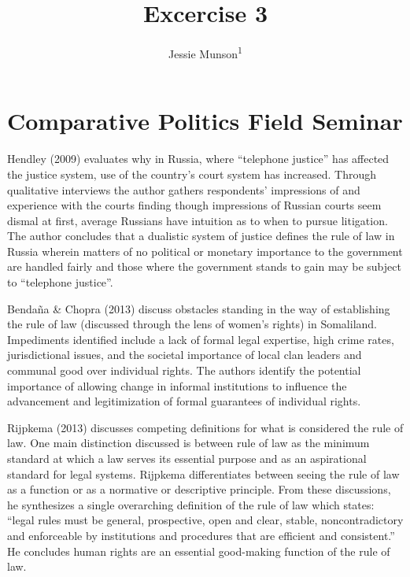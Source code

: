 \documentclass[
  english,
  man]{apa6}
\title{Excercise 3}
\author{Jessie Munson\textsuperscript{1}}
\date{}
\affiliation{\vspace{0.5cm}\textsuperscript{1} University of Wisconsin - Madison\\\textsuperscript{2} Department of Political Science}
\begin{document}
\maketitle

\hypertarget{comparative-politics-field-seminar}{%
\section{Comparative Politics Field Seminar}\label{comparative-politics-field-seminar}}

Hendley (2009) evaluates why in Russia, where \enquote{telephone justice} has affected the justice system, use of the country's court system has increased. Through qualitative interviews the author gathers respondents' impressions of and experience with the courts finding though impressions of Russian courts seem dismal at first, average Russians have intuition as to when to pursue litigation. The author concludes that a dualistic system of justice defines the rule of law in Russia wherein matters of no political or monetary importance to the government are handled fairly and those where the government stands to gain may be subject to \enquote{telephone justice}.

Bendaña \& Chopra (2013) discuss obstacles standing in the way of establishing the rule of law (discussed through the lens of women's rights) in Somaliland. Impediments identified include a lack of formal legal expertise, high crime rates, jurisdictional issues, and the societal importance of local clan leaders and communal good over individual rights. The authors identify the potential importance of allowing change in informal institutions to influence the advancement and legitimization of formal guarantees of individual rights.

Rijpkema (2013) discusses competing definitions for what is considered the rule of law. One main distinction discussed is between rule of law as the minimum standard at which a law serves its essential purpose and as an aspirational standard for legal systems. Rijpkema differentiates between seeing the rule of law as a function or as a normative or descriptive principle. From these discussions, he synthesizes a single overarching definition of the rule of law which states: \enquote{legal rules must be general, prospective, open and clear, stable, noncontradictory and enforceable by institutions and procedures that are efficient and consistent.} He concludes human rights are an essential good-making function of the rule of law.
\end{document}
